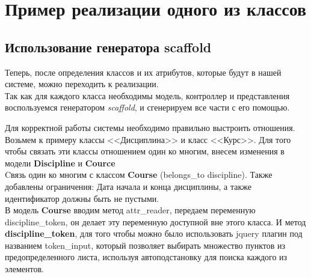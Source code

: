 \section{Пример реализации одного из классов}

\subsection{Использование генератора scaffold}
\hspace*{0.25см}Теперь, после определения классов и их атрибутов, которые будут в нашей системе, можно переходить к реализации.\\
Так как для каждого класса необходимы модель, контроллер и представления воспользуемся генератором \textit{scaffold}, и сгенерируем все части с его помощью.

Для корректной работы системы необходимо правильно выстроить отношения. Возьмем к примеру классы <<Дисциплина>> и класс <<Курс>>. Для того чтобы связать эти классы отношением один ко многим, внесем изменения в модели \textbf{Discipline} и \textbf{Cource}\\


Cвязь один ко многим с классом \textbf{Course} (belongs\_to \:discipline). Также добавлены ограничения: Дата начала и конца дисциплины, а также идентификатор должны быть не пустыми.\\
В модель \textbf{Course} вводим метод attr\_reader, передаем переменную \:discipline\_token, он делает эту переменную доступной вне этого класса. И метод \textbf{discipline\_token}, для того чтобы можно было использовать jquery плагин под названием token\_input, который позволяет выбирать множество пунктов из предопределенного листа, используя автоподстановку для поиска каждого из элементов.\\

